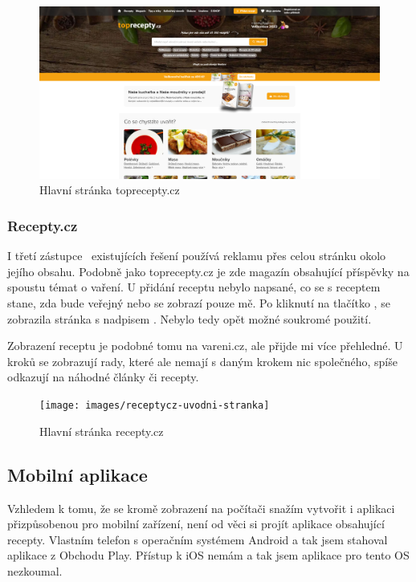 \begin{figure}[H]
    \includegraphics[width=\textwidth]{images/topreceptycz-uvodni-stranka}
    \caption{Hlavní stránka toprecepty.cz} \label{picture:topreceptycz:uvodni-stranka}
\end{figure}

\subsubsection{Recepty.cz}

I třetí zástupce~\cite{ReceptyCZ} existujících řešení používá reklamu přes celou stránku okolo jejího obsahu. Podobně jako toprecepty.cz
je zde magazín obsahující příspěvky na spoustu témat o vaření. U přidání receptu nebylo napsané, co se s receptem stane,
zda bude veřejný nebo se zobrazí pouze mě. Po kliknutí na tlačítko , se zobrazila stránka s nadpisem
. Nebylo tedy opět možné soukromé použití.

Zobrazení receptu je podobné tomu na vareni.cz, ale přijde mi více přehledné. U kroků se zobrazují rady, které ale
nemají s daným krokem nic společného, spíše odkazují na náhodné články či recepty.

\begin{figure}[H]
    \texttt{[image: images/receptycz-uvodni-stranka]}
    \caption{Hlavní stránka recepty.cz} \label{picture:receptycz:uvodni-stranka}
\end{figure}

\subsection{Mobilní aplikace}

Vzhledem k tomu, že se kromě zobrazení na počítači snažím vytvořit i aplikaci přizpůsobenou pro mobilní zařízení, není od věci
si projít aplikace obsahující recepty. Vlastním telefon s operačním systémem Android a tak jsem stahoval aplikace z Obchodu Play.
Přístup k iOS nemám a tak jsem aplikace pro tento OS nezkoumal.

